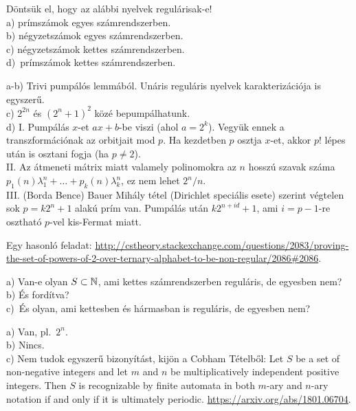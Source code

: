 \begin{Exercise}[counter={sorszam}, difficulty=0]
	Döntsük el, hogy az alábbi nyelvek regulárisak-e!\\
a) prímszámok egyes számrendszerben.\\
b) négyzetszámok egyes számrendszerben.\\ 
c) négyzetszámok kettes számrendszerben.\\
d)~\hard prímszámok kettes számrendszerben.
\end{Exercise}
\begin{Answer}
	a-b) Trivi pump\'al\'os lemm\'ab\'ol. Un\'aris regul\'aris nyelvek karakteriz\'aci\'oja is egyszer\H u.\\
	c) $2^{2n}$ \'es $(2^n+1)^2$ k\"oz\'e bepump\'alhatunk.\\
	d) I. Pump\'al\'as $x$-et $ax+b$-be viszi (ahol $a=2^k$).
	Vegy\"uk ennek a transzform\'aci\'onak az orbitjait mod $p$.
	Ha kezdetben $p$ osztja $x$-et, akkor $p!$ l\'epes ut\'an is osztani fogja (ha $p\ne 2$).\\
	II. Az \'atmeneti m\'atrix miatt valamely polinomokra az $n$ hossz\'u szavak sz\'ama $p_1(n)\lambda_1^n+\ldots+p_k(n)\lambda_k^n$, ez nem lehet $2^n/n$.\\
	III. (Borda Bence) Bauer Mih\'aly t\'etel (Dirichlet speci\'alis esete) szerint v\'egtelen sok $p=k2^n+1$ alak\'u pr\'im van. Pump\'al\'as ut\'an $k2^{n+id}+1$, ami $i=p-1$-re oszthat\'o $p$-vel kis-Fermat miatt.
	
	Egy hasonl\'o feladat: \url{http://cstheory.stackexchange.com/questions/2083/proving-the-set-of-powers-of-2-over-ternary-alphabet-to-be-non-regular/2086#2086}.
\end{Answer}


\begin{Exercise}[counter={sorszam}, difficulty=0]
	a) Van-e olyan $S\subset \mathbb{N}$, ami kettes számrendszerben reguláris, de egyesben nem?\\
	b) És fordítva?\\
	c)~\veryhard És olyan, ami kettesben és hármasban is reguláris, de egyesben nem?
\end{Exercise}	
\begin{Answer}
	a) Van, pl.\ $2^n$.\\
	b) Nincs.\\
	c) Nem tudok egyszer\H u bizony\'it\'ast, kij\"on a Cobham T\'etelb\H ol: Let $S$ be a set of non-negative integers and let $m$ and $n$ be multiplicatively independent positive integers. Then $S$ is recognizable by finite automata in both $m$-ary and $n$-ary notation if and only if it is ultimately periodic.
	\url{https://arxiv.org/abs/1801.06704}.
\end{Answer}


